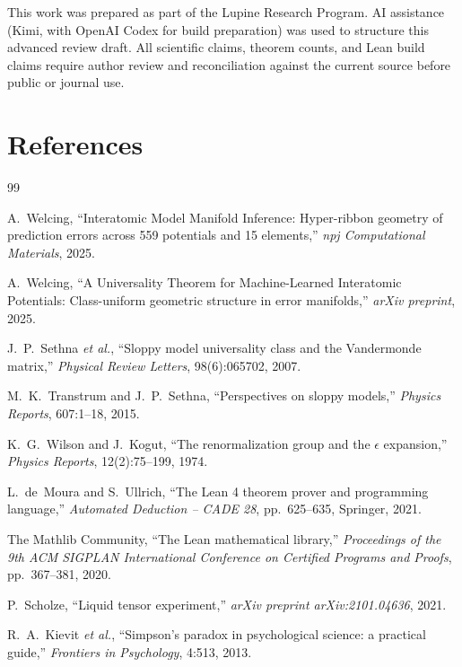 \documentclass[11pt,a4paper]{article}
\theoremstyle{definition}
\theoremstyle{plain}
\begin{document}
This work was prepared as part of the Lupine Research Program. AI assistance
(Kimi, with OpenAI Codex for build preparation) was used to structure this
advanced review draft. All scientific claims, theorem counts, and Lean build
claims require author review and reconciliation against the current source
before public or journal use.

\section*{References}

\begin{thebibliography}{99}

A.~Welcing, ``Interatomic Model Manifold Inference: Hyper-ribbon geometry of prediction errors across 559 potentials and 15 elements,'' \emph{npj Computational Materials}, 2025.

A.~Welcing, ``A Universality Theorem for Machine-Learned Interatomic Potentials: Class-uniform geometric structure in error manifolds,'' \emph{arXiv preprint}, 2025.

J.~P.~Sethna \emph{et al.}, ``Sloppy model universality class and the Vandermonde matrix,'' \emph{Physical Review Letters}, 98(6):065702, 2007.

M.~K.~Transtrum and J.~P.~Sethna, ``Perspectives on sloppy models,'' \emph{Physics Reports}, 607:1--18, 2015.

K.~G.~Wilson and J.~Kogut, ``The renormalization group and the $\epsilon$ expansion,'' \emph{Physics Reports}, 12(2):75--199, 1974.

L.~de~Moura and S.~Ullrich, ``The Lean 4 theorem prover and programming language,'' \emph{Automated Deduction -- CADE 28}, pp.~625--635, Springer, 2021.

The Mathlib Community, ``The Lean mathematical library,'' \emph{Proceedings of the 9th ACM SIGPLAN International Conference on Certified Programs and Proofs}, pp.~367--381, 2020.

P.~Scholze, ``Liquid tensor experiment,'' \emph{arXiv preprint arXiv:2101.04636}, 2021.

R.~A.~Kievit \emph{et al.}, ``Simpson's paradox in psychological science: a practical guide,'' \emph{Frontiers in Psychology}, 4:513, 2013.


\end{thebibliography}
\end{document}

